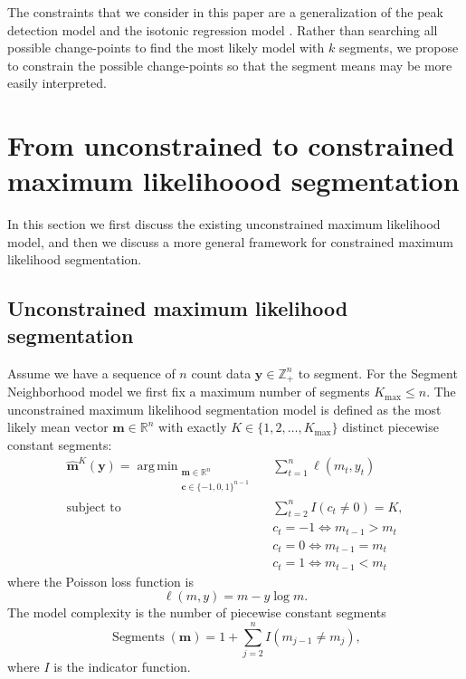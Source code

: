 \documentclass{article}
\DeclareMathOperator*{\argmin}{arg\,min}
\DeclareMathOperator*{\Segments}{Segments}
\newcommand{\ZZ}{\mathbb Z}
\newcommand{\RR}{\mathbb R}
\begin{document}
The constraints that we consider in this paper are a generalization of
the peak detection model \citep{PeakSeg} and the isotonic regression
model \citep{mair2009isotone}. Rather than searching all possible
change-points to find the most likely model with $k$ segments, we
propose to constrain the possible change-points so that the segment
means may be more easily interpreted.

\section{From unconstrained to constrained maximum likelihoood
  segmentation}
\label{sec:model}

In this section we first discuss the existing unconstrained maximum
likelihood model, and then we discuss a more general framework for
constrained maximum likelihood segmentation.

\subsection{Unconstrained maximum likelihood segmentation}

Assume we have a sequence of $n$ count data $\mathbf y\in\ZZ_+^n$ to
segment. For the Segment Neighborhood model we first fix a maximum
number of segments $ K_{\max}\leq n$. The unconstrained maximum
likelihood segmentation model is defined as the most likely mean
vector $\mathbf m\in\RR^n$ with exactly
$K\in\{1, 2, \dots, K_{\max}\}$ distinct piecewise constant segments:
\begin{align}
  \label{unconstrained}
  \mathbf{\hat m}^K(\mathbf y) =
    \argmin_{\substack{
  \mathbf m\in\RR^{n}
  \\
  \mathbf c\in\{-1,0,1\}^{n-1}
  }} &\ \ 
    \sum_{t=1}^n \ell( m_t,  y_t) 
\\
    \text{subject to} &\ \  \sum_{t=2}^n I(c_t \neq 0) = K, \\
& \ \ c_t = -1 \Leftrightarrow m_{t-1} > m_t\\
& \ \ c_t = 0 \Leftrightarrow m_{t-1} = m_t\\
& \ \ c_t = 1 \Leftrightarrow m_{t-1} < m_t
\nonumber
\end{align}
where the Poisson loss function is
\begin{equation}\label{eq:loss}
  \ell( m,  y)= m - y \log m.
\end{equation} 
The model complexity is the number of piecewise constant segments
\begin{equation}
  \Segments(\mathbf m)=1+\sum_{j=2}^n I(m_{j-1} \neq m_{j}),
\end{equation}
where $I$ is the indicator function. 
\end{document}

